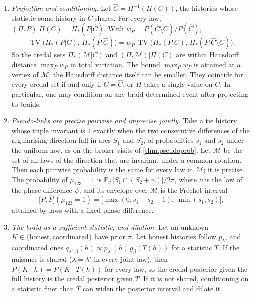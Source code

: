 \documentclass[11pt]{article}
\theoremstyle{definition}\newtheorem{definition}[theorem]{Definition}\newtheorem{remark}[theorem]{Remark}\newtheorem{example}[theorem]{Example}\newtheorem{problem}[theorem]{Open problem}\crefname{problem}{Problem}{Problems}
\begin{document}
\begin{proposition}\label{prop:credalbraid}
\begin{enumerate}
\item[(i)] \emph{Projection and conditioning.} Let $\hat C=\Pi^{-1}(\Pi(C))$, the histories whose statistic some history in $C$ shares. For every law, $(\Pi_*P)|\Pi(C)=\Pi_*(P|\hat C)$. With $w_P=P(\hat C\setminus C)/P(\hat C)$,
\[
\operatorname{TV}\big(\Pi_*(P|C),\,\Pi_*(P|\hat C)\big)=w_P\,\operatorname{TV}\big(\Pi_*(P|C),\,\Pi_*(P|\hat C\setminus C)\big).
\]
So the credal sets $\Pi_*(\mathcal M|C)$ and $(\Pi_*\mathcal M)|\Pi(C)$ are within Hausdorff distance $\max_P w_P$ in total variation. The bound $\max_Pw_P$ is attained at a vertex of $\mathcal M$; the Hausdorff distance itself can be smaller. They coincide for every credal set if and only if $C=\hat C$, or $\Pi$ takes a single value on $C$. In particular, one may condition on any braid-determined event after projecting to braids.
\item[(ii)] \emph{Pseudo-links are precise pairwise and imprecise jointly.} Take a tie history whose triple invariant is $1$ exactly when the two consecutive differences of the regularising direction fall in arcs $S_1$ and $S_2$, of probabilities $s_1$ and $s_2$ under the uniform law, as on the broker visits of \cref{thm:pseudoprob}. Let $\mathcal M$ be the set of all laws of the direction that are invariant under a common rotation. Then each pairwise probability is the same for every law in $\mathcal M$; it is precise. The probability of $\mu_{123}=1$ is $\mathbb E_\nu\,|S_1\cap(S_2+\psi)|/2\pi$, where $\nu$ is the law of the phase difference $\psi$, and its envelope over $\mathcal M$ is the Fr\'echet interval
\[
\big[\underline P,\overline P\big](\mu_{123}=1)=\big[\max(0,s_1+s_2-1),\ \min(s_1,s_2)\big],
\]
attained by laws with a fixed phase difference.
\item[(iii)] \emph{The braid as a sufficient statistic, and dilation.} Let an unknown $K\in\{\text{honest},\text{coordinated}\}$ have prior $\pi$. Let honest histories follow $p_\lambda$, and coordinated ones $q_{\lambda',\beta}(h)\propto p_{\lambda'}(h)\,g_\beta(T(h))$ for a statistic $T$. If the nuisance is shared ($\lambda=\lambda'$ in every joint law), then $P(K\mid h)=P(K\mid T(h))$ for every law, so the credal posterior given the full history is the credal posterior given $T$. If it is not shared, conditioning on a statistic finer than $T$ can widen the posterior interval and dilate it.
\end{enumerate}
\end{proposition}
\end{document}
